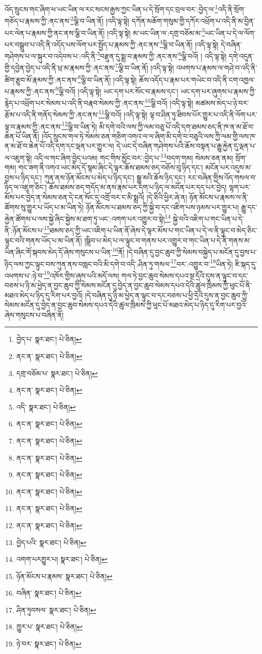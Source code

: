 འོད་སྲུངས་གང་ཞིག་ཕ་ཡང་ཡིན་ལ་རང་སངས་རྒྱས་ཀྱང་ཡིན་པ་དེ་སྲོག་དང་བྲལ་བར་:བྱེད་ལ་\footnote{བྱེད་པ་  སྣར་ཐང་།  པེ་ཅིན། }འདི་ནི་སྲོག་གཅོད་པ་རྣམས་ཀྱི་:ནང་ནས་\footnote{ནང་ན་  སྣར་ཐང་།  པེ་ཅིན། }ལྕི་བ་ཡིན་ནོ། །འདི་ལྟ་སྟེ། དཀོན་མཆོག་གསུམ་གྱི་དཀོར་འཕྲོག་པ་འདི་ནི་མ་བྱིན་པར་ལེན་པ་རྣམས་ཀྱི་ནང་ནས་ལྕི་བ་ཡིན་ནོ། །འདི་ལྟ་སྟེ། མ་ཡང་ཡིན་ལ་:དགྲ་བཅོམ་མ་\footnote{དགྲ་བཅོམ་པ་  སྣར་ཐང་།  པེ་ཅིན། }ཡང་ཡིན་པ་དེ་ལ་ལོག་པར་བསྒྲུབ་པ་འདི་ནི་འདོད་པས་ལོག་པར་སྤྱོད་པ་རྣམས་ཀྱི་:ནང་ནས་\footnote{ནང་ན་  སྣར་ཐང་།  པེ་ཅིན། }ལྕི་བ་ཡིན་ནོ། །འདི་ལྟ་སྟེ། དེ་བཞིན་གཤེགས་པ་ལ་སྐུར་བ་འདེབས་པ་:འདི་ནི་\footnote{འདི་  སྣར་ཐང་།  པེ་ཅིན། }བརྫུན་དུ་སྨྲ་བ་རྣམས་ཀྱི་:ནང་ནས་\footnote{ནང་ན་  སྣར་ཐང་།  པེ་ཅིན། }ལྕི་བའོ། །
འདི་ལྟ་སྟེ། དགེ་འདུན་གྱི་དབྱེན་བྱེད་པ་འདི་ནི་ཕྲ་མ་རྣམས་ཀྱི་:ནང་ནས་\footnote{ནང་ན་  སྣར་ཐང་།  པེ་ཅིན། }ལྕི་བ་ཡིན་ནོ། །འདི་ལྟ་སྟེ། འཕགས་པ་རྣམས་ལ་གཤེ་བ་འདི་ནི་ཚིག་རྩུབ་མོ་རྣམས་ཀྱི་:ནང་ནས་\footnote{ནང་ན་  སྣར་ཐང་།  པེ་ཅིན། }ལྕི་བ་ཡིན་ནོ། །འདི་ལྟ་སྟེ། ཆོས་འདོད་པ་རྣམ་པར་གཡེང་བ་འདི་ནི་ངག་འཁྱལ་པ་རྣམས་ཀྱི་:ནང་ནས་\footnote{ནང་ན་  སྣར་ཐང་།  པེ་ཅིན། }ལྕི་བའོ། །འདི་ལྟ་སྟེ། ཡང་དག་པར་སོང་བ་རྣམས་དང་། ཡང་དག་པར་ཞུགས་པ་རྣམས་ཀྱི་རྙེད་པ་འཕྲོག་པར་སེམས་པ་འདི་ནི་བརྣབ་སེམས་ཀྱི་:ནང་ནས་\footnote{ནང་ན་  སྣར་ཐང་།  པེ་ཅིན། }ལྕི་བའོ། །འདི་ལྟ་སྟེ། མཚམས་མེད་པ་ཉེ་བར་རྩོམ་པ་འདི་ནི་གནོད་སེམས་ཀྱི་:ནང་ནས་\footnote{ནང་ན་  སྣར་ཐང་།  པེ་ཅིན། }ལྕི་བའོ། །འདི་ལྟ་སྟེ། ལྟ་བ་ཤིན་ཏུ་ཐིབས་པོར་གྱུར་པ་འདི་ནི་ལོག་པར་ལྟ་བ་རྣམས་ཀྱི་:ནང་ནས་\footnote{ནང་ན་  སྣར་ཐང་།  པེ་ཅིན། }ལྕི་བ་ཡིན་ཏེ། མི་དགེ་བའི་ལས་ཀྱི་ལམ་བཅུ་པོ་འདི་དག་ཐམས་ཅད་ནི་ཁ་ན་མ་ཐོ་བ་ཆེན་པོ་ཡིན་ནོ། །འོད་སྲུངས་གལ་ཏེ་སེམས་ཅན་གཅིག་འགའ་ལ་ལ་ཞིག་མི་དགེ་བ་བཅུའི་ལས་ཀྱི་ལམ་གྱི་ལས་ཁ་ན་མ་ཐོ་བ་ཆེན་པོ་འདི་དག་དང་ལྡན་པར་གྱུར་ལ། དེ་ཡང་དེ་བཞིན་གཤེགས་པའི་ཆོས་བསྟན་པ་རྒྱུ་རྐྱེན་དུ་ལྡན་པ་ལ་འཇུག་སྟེ། འདི་ལ་གང་ཞིག་བྱེད་པའམ། གང་གིས་མྱོང་བར་:བྱེད་པ་\footnote{བྱེད་པའི་  སྣར་ཐང་།  པེ་ཅིན། }བདག་གམ། སེམས་ཅན་ནམ། སྲོག་གམ། གང་ཟག་ནི་འགའ་ཡང་མེད་དོ་སྙམ་ཞིང་དེ་ལྟར་ཆོས་ཐམས་ཅད་བཅོས་བུ་ཉིད་དང་། མངོན་པར་འདུས་མ་བྱས་པ་ཉིད་དང་། ཀུན་ནས་ཉོན་མོངས་པ་མེད་པ་ཉིད་དང་། སྒྱུ་མའི་ཆོས་ཉིད་དང་། རང་བཞིན་གྱིས་འོད་གསལ་བ་ཉིད་ལ་འཇུག་ཅིང་། ཆོས་ཐམས་ཅད་གདོད་མ་ནས་རྣམ་པར་དག་པ་ཉིད་ལ་མངོན་པར་དད་པར་བྱེད། ལྷག་པར་མོས་པར་བྱེད་ན་སེམས་ཅན་དེ་ངན་སོང་དུ་འགྲོ་བར་ང་མི་སྨྲའོ། །དེ་ཅིའི་ཕྱིར་ཞེ་ན། ཉོན་མོངས་པ་རྣམས་ལ་ནི་ཚོགས་སུ་གྱུར་པ་ཡོད་པ་མ་ཡིན་ཏེ། ཉོན་མོངས་པ་ཐམས་ཅད་ཀྱི་སྐྱེ་བ་དང་འཇིག་པས་ཉམས་པར་གྱུར་པ། རྒྱུ་དང་རྐྱེན་ཚོགས་པ་ལས་སྐྱེ་ཞིང་སྐྱེས་མ་ཐག་ཏུ་ཡང་:འགག་པར་འགྱུར་བ་སྟེ།\footnote{འགག་པརགྱུར་པ།  སྣར་ཐང་།  པེ་ཅིན། } སྐྱེ་བའི་འཇིག་པ་གང་ཡིན་པ་དེ་ནི་:ཉོན་མོངས་པ་\footnote{ཉོན་མོངས་པ་རྣམས་  སྣར་ཐང་།  པེ་ཅིན། }ཐམས་ཅད་ཀྱི་ཡང་འཇིག་པ་ཡིན་ནོ་ཞེས་དེ་ལྟར་མོས་པ་གང་ཡིན་པ་དེ་ལ་ནི་ལྟུང་བ་མེད་ཅིང་ལྟུང་བའི་གནས་ཡོད་པ་མ་ཡིན་ནོ། །སྒྲིབ་པ་མེད་པ་ལ་ལྟུང་བ་གནས་པར་འགྱུར་བ་གང་ཡིན་པ་དེ་ནི་གནས་མ་ཡིན་ཞིང་གོ་སྐབས་མེད་དོ་ཞེས་གསུངས་པ་ཡིན་\footnote{བཞིན་  སྣར་ཐང་།  པེ་ཅིན། }ནོ། །དེ་བཞིན་དུ་བྱང་ཆུབ་ཀྱི་སེམས་བསྐྱེད་པ་མངོན་དུ་བྱས་པ་ཉིད་ལས་ཀྱང་ལྟུང་བས་ཀུན་ནས་བསླང་བའི་མི་དགེ་བ་འདི་:ཤིན་ཏུ་གསལ་\footnote{ཤིན་ཏུབསལ་  སྣར་ཐང་།  པེ་ཅིན། }བར་:འགྱུར་བ་\footnote{གྱུར་པ་  སྣར་ཐང་།  པེ་ཅིན། }ཡིན་ཏེ། ཇི་སྐད་དུ་འཕགས་པ་:ཉེ་བ་\footnote{ཉེ་བར་  སྣར་ཐང་།  པེ་ཅིན། }འཁོར་གྱིས་ཞུས་པའི་མདོ་ལས། གལ་ཏེ་བྱང་ཆུབ་སེམས་དཔའ་སྔ་དྲོའི་དུས་ན་ལྟུང་བ་དང་བཅས་པ་ཉི་མ་ཕྱེད་ན་བྱང་ཆུབ་ཀྱི་སེམས་མངོན་དུ་བྱེད་ན་བྱང་ཆུབ་སེམས་དཔའ་དེའི་ཚུལ་ཁྲིམས་ཀྱི་ཕུང་པོ་ནི་མཐའ་མེད་པ་ཉིད་དུ་རིག་པར་བྱའོ། །དེ་བཞིན་དུ་ཉི་མ་ཕྱེད་ན་ལྟུང་བ་དང་བཅས་པ་ཕྱི་དྲོའི་དུས་ན་བྱང་ཆུབ་ཀྱི་སེམས་མངོན་དུ་བྱེད་ན་བྱང་ཆུབ་སེམས་དཔའ་དེའི་ཚུལ་ཁྲིམས་ཀྱི་ཕུང་པོ་མཐའ་མེད་པ་ཉིད་དུ་རིག་པར་བྱའོ་ཞེས་གསུངས་པ་བཞིན་ནོ། 